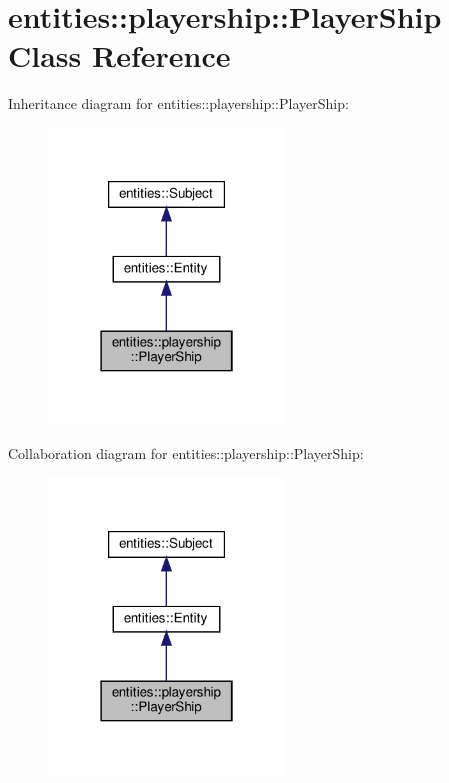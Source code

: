 \hypertarget{classentities_1_1playership_1_1PlayerShip}{}\section{entities\+:\+:playership\+:\+:Player\+Ship Class Reference}
\label{classentities_1_1playership_1_1PlayerShip}


Inheritance diagram for entities\+:\+:playership\+:\+:Player\+Ship\+:\nopagebreak
\begin{figure}[H]
\begin{center}
\leavevmode
\includegraphics[width=178pt]{classentities_1_1playership_1_1PlayerShip__inherit__graph}
\end{center}
\end{figure}


Collaboration diagram for entities\+:\+:playership\+:\+:Player\+Ship\+:\nopagebreak
\begin{figure}[H]
\begin{center}
\leavevmode
\includegraphics[width=178pt]{classentities_1_1playership_1_1PlayerShip__coll__graph}
\end{center}
\end{figure}
